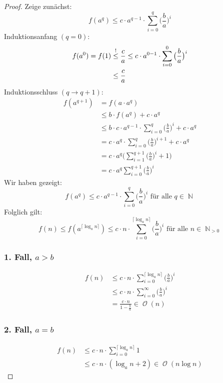 \documentclass[a4paper,12pt]{article}
\DeclareMathOperator{\N}{\mathbb N}
\DeclareMathOperator{\BigO}{\mathcal O}
\theoremstyle{definition}
\begin{document}
	\begin{proof}
		Zeige zunächst: \[
			f(a^q) \leq c \cdot a^{q - 1} \cdot \sum_{i = 0}^{q}\big(\frac{b}{a}\big)^i
		\]
		Induktionsanfang $(q = 0)$: 
		\begin{align*}
			f(a^0) = f(1) &\stackrel{\tiny !}{\leq} \frac{c}{a} \leq c \cdot a^{0 - 1}\cdot \sum_{i = 0}^{0}\big(\frac{b}{a}\big)^i\\
			&\leq \frac{c}{a}
		\end{align*}
		Induktionsschluss $(q \to q + 1)$:
		\begin{align*}
			f(a^{q + 1}) &= f(a \cdot a^q)\\
			&\leq b \cdot f(a^q) + c\cdot a^q\\
			&\leq b \cdot c \cdot a^{q - 1} \cdot \sum_{i = 0}^{q}\big(\frac{b}{a}\big)^i + c\cdot a^q\\
			&= c \cdot a^q \cdot \sum_{i = 0}^{q} \big(\frac{b}{a}\big)^{i + 1} + c \cdot a^q\\
			&= c \cdot a^q\Big(\sum_{i = 1}^{q + 1}\big(\frac{b}{a}\big)^i + 1\Big)\\
			&= c \cdot a^q\sum_{i = 0}^{q + 1}\big(\frac{b}{a}\big)^i
		\end{align*}
		Wir haben gezeigt:
		\[
			f(a^q) \leq c \cdot a^{q - 1}\cdot \sum_{i = 0}^{q}\big(\frac{b}{a}\big)^i \text{ für alle } q \in \N
		\]
		Folglich gilt:
		\[
			f(n) \leq f(a^{\lceil \log_a n\rceil}) \leq c \cdot n \cdot \sum_{i = 0}^{\lceil \log_a n\rceil}\big(\frac{b}{a}\big)^i \text{ für alle } n \in \N_{>0}
		\]
		\subsubsection*{1. Fall, $a > b$}
		\begin{align*}
			f(n) &\leq c \cdot n \cdot \sum_{i = 0}^{\lceil \log_a n\rceil}\big(\frac{b}{a}\big)^i\\
			&\leq c \cdot n \cdot \sum_{i = 0}^{\infty}\big(\frac{b}{a}\big)^i\\
			&= \frac{c\cdot n}{1 - \frac{b}{a}} \in \BigO(n)
		\end{align*}
		\subsubsection*{2. Fall, $a = b$}
		\begin{align*}
			f(n) & \leq c \cdot n \cdot \sum_{i = 0}^{\lceil \log_a n\rceil}1\\
			&\leq c \cdot n \cdot (\log_a n + 2) \in \BigO(n \log n)
		\end{align*}

\end{proof}
\end{document}
